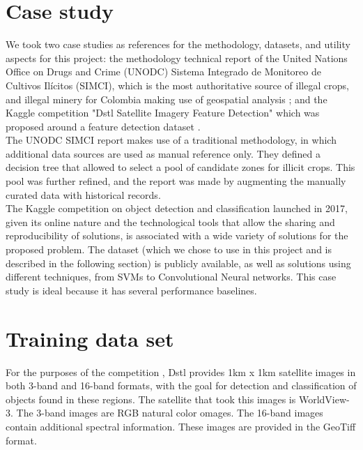 \documentclass{article}
\begin{document}
\section{Case study}

We took two case studies as references for the methodology, datasets, and utility aspects for this project: the methodology technical report of the United Nations Office on Drugs and Crime (UNODC) Sistema Integrado de Monitoreo de Cultivos Ilícitos (SIMCI), which is the most authoritative source of illegal crops, and illegal minery for Colombia making use of geospatial analysis \cite{Nevada2017MetodologiaCoca}; and the Kaggle competition "Dstl Satellite Imagery Feature Detection" which was proposed around a feature detection dataset \cite{kaggledstl2017}.\\

The UNODC SIMCI report \cite{UNODC2017Monitoreo2017} makes use of a traditional methodology, in which additional data sources are used as manual reference only. They defined a decision tree that allowed to select a pool of candidate zones for illicit crops. This pool was further refined, and the report was made by augmenting the manually curated data with historical records.\\

The Kaggle competition on object detection and classification launched in 2017, given its online nature and the technological tools that allow the sharing and reproducibility of solutions, is associated with a wide variety of solutions for the proposed problem. The dataset (which we chose to use in this project and is described in the following section) is publicly available, as well as solutions using different techniques, from SVMs to Convolutional Neural networks. This case study is ideal because it has several performance baselines.

\section{Training data set}

For the purposes of the competition \cite{kaggledstl2017}, Dstl provides 1km x 1km satellite images in both 3-band and 16-band formats, with the goal for detection and classification of objects found in these regions. The satellite that took this images is WorldView-3. The 3-band images are RGB natural color omages. The 16-band images contain additional spectral information. These images are provided in the GeoTiff format.\\
\end{document}
